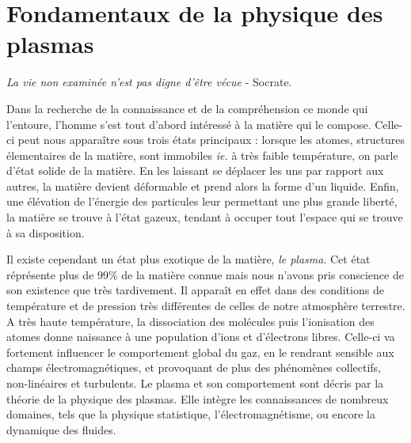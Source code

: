 	\section{Fondamentaux de la physique des plasmas}
		\emph{La vie non examinée n'est pas digne d'être vécue }- Socrate. 
		
		Dans la recherche de la connaissance et de la compréhension ce monde qui
		l'entoure, l'homme s'est tout d'abord intéressé à la matière qui le compose. Celle-ci
		peut nous apparaître sous trois états principaux : lorsque les atomes,
		structures élementaires de la matière, sont immobiles \emph{ie.} à très faible
		température, on parle d'état solide de la matière. En les laissant se déplacer
		les uns par rapport aux autres, la matière devient déformable et prend alors
		la forme d'un liquide. Enfin, une élévation de l'énergie des particules leur
		permettant une plus grande liberté, la matière se trouve à l'état gazeux, 
		tendant à occuper tout l'espace qui se trouve à sa disposition.
		
		Il existe cependant un état plus exotique de la matière, \emph{le plasma}. Cet
		état réprésente plus de 99\% de la matière connue mais nous n'avons pris conscience
		de son existence que très tardivement. Il apparaît en effet dans des
		conditions de température et de pression très différentes de celles de notre
		atmosphère terrestre. A très haute température, la dissociation des
		molécules puis l'ionisation des atomes donne naissance à une
		population d'ions et d'électrons libres. Celle-ci va fortement influencer le
		comportement global du gaz, en le rendrant sensible aux champs
		électromagnétiques, et provoquant de plus des phénomènes collectifs,
		non-linéaires et turbulents. Le plasma et son comportement sont décris par la
		théorie de la physique des plasmas. Elle intègre les connaissances de
		nombreux domaines, tels que la physique statistique, l'électromagnétisme, ou
		encore la dynamique des fluides. 
		
